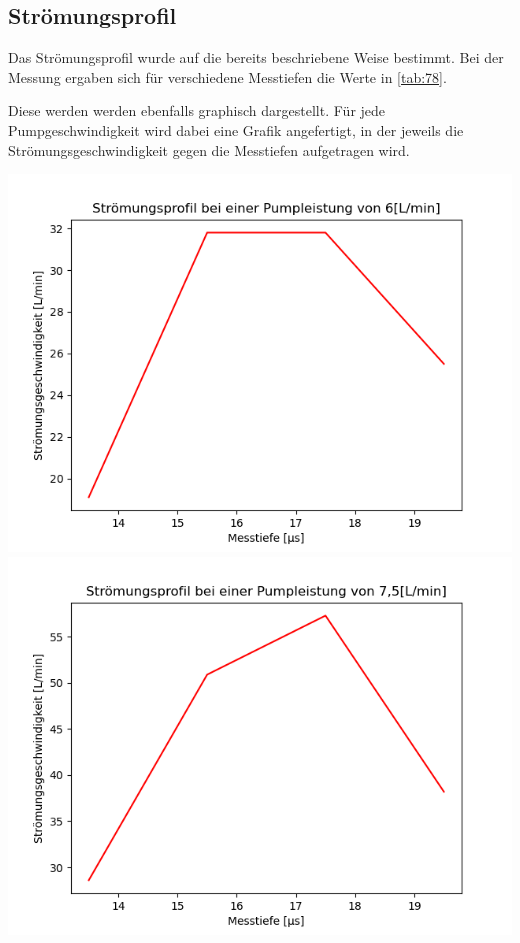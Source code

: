 \documentclass[titlepage=firstcover, captions=tableheading]{scrartcl}
\begin{document}
\subsection{Strömungsprofil}

Das Strömungsprofil wurde auf die bereits beschriebene Weise bestimmt.
Bei der Messung ergaben sich für verschiedene Messtiefen die Werte in \ref{tab:78}.

\noindent Diese werden werden ebenfalls graphisch dargestellt. Für jede Pumpgeschwindigkeit wird dabei eine Grafik angefertigt, in der jeweils die Strömungsgeschwindigkeit gegen die Messtiefen aufgetragen wird.

\includegraphics{4.png}
\includegraphics{5.png}
\end{document}
